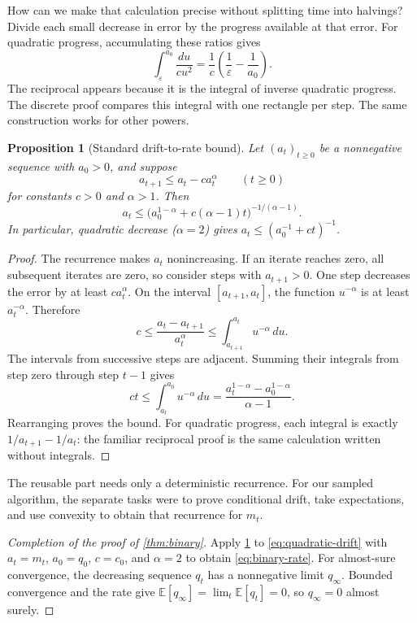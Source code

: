 \documentclass[11pt,twoside]{article}
\newcommand{\E}{\mathbb E}
\newtheorem{proposition}[theorem]{Proposition}
\theoremstyle{definition}
\theoremstyle{remark}
\begin{document}
How can we make that calculation precise without splitting time into
halvings? Divide each small decrease in error by the progress available at
that error. For quadratic progress, accumulating these ratios gives
\[
 \int_\varepsilon^{a_0}\frac{du}{cu^2}
 =\frac1c\left(\frac1\varepsilon-\frac1{a_0}\right).
\]
The reciprocal appears because it is the integral of inverse quadratic
progress. The discrete proof compares this integral with one rectangle
per step. The same construction works for other powers.

\begin{proposition}[Standard drift-to-rate bound]
\label{prop:drift-rate}
Let $(a_t)_{t\ge0}$ be a nonnegative sequence with $a_0>0$, and suppose
\[
 a_{t+1}\le a_t-ca_t^\alpha
 \qquad(t\ge0)
\]
for constants $c>0$ and $\alpha>1$. Then
\[
 a_t\le\bigl(a_0^{1-\alpha}+c(\alpha-1)t\bigr)^{-1/(\alpha-1)}.
\]
In particular, quadratic decrease ($\alpha=2$) gives
$a_t\le(a_0^{-1}+ct)^{-1}$.
\end{proposition}
\begin{proof}
The recurrence makes $a_t$ nonincreasing. If an iterate reaches zero,
all subsequent iterates are zero, so consider steps with $a_{t+1}>0$.
One step decreases the error by at least $ca_t^\alpha$.
On the interval $[a_{t+1},a_t]$, the function $u^{-\alpha}$ is at
least $a_t^{-\alpha}$. Therefore
\[
 c\le\frac{a_t-a_{t+1}}{a_t^\alpha}
 \le\int_{a_{t+1}}^{a_t}u^{-\alpha}\,du.
\]
The intervals from successive steps are adjacent. Summing their integrals
from step zero through step $t-1$ gives
\[
 ct\le\int_{a_t}^{a_0}u^{-\alpha}\,du
 =\frac{a_t^{1-\alpha}-a_0^{1-\alpha}}{\alpha-1}.
\]
Rearranging proves the bound. For quadratic progress, each integral is
exactly $1/a_{t+1}-1/a_t$: the familiar reciprocal proof is the same
calculation written without integrals.
\end{proof}

The reusable part needs only a deterministic recurrence. For our sampled
algorithm, the separate tasks were to prove conditional drift, take
expectations, and use convexity to obtain that recurrence for $m_t$.


\begin{proof}[Completion of the proof of \cref{thm:binary}]
Apply \cref{prop:drift-rate} to \cref{eq:quadratic-drift} with
$a_t=m_t$, $a_0=q_0$, $c=c_0$, and $\alpha=2$ to obtain
\cref{eq:binary-rate}.
For almost-sure convergence, the decreasing sequence $q_t$ has a
nonnegative limit $q_\infty$. Bounded convergence and the rate give
$\E[q_\infty]=\lim_t\E[q_t]=0$, so $q_\infty=0$ almost surely.
\end{proof}
\end{document}
